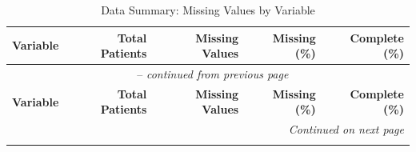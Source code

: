 \begin{longtable}{lrrrr}
\caption{Data Summary: Missing Values by Variable} \label{tab:data_summary} \\
\toprule
\textbf{Variable} & \textbf{Total Patients} & \textbf{Missing Values} & \textbf{Missing (\%)} & \textbf{Complete (\%)} \\
\midrule
\endfirsthead
\multicolumn{5}{c}{\tablename\ \thetable{} -- \textit{continued from previous page}} \\
\toprule
\textbf{Variable} & \textbf{Total Patients} & \textbf{Missing Values} & \textbf{Missing (\%)} & \textbf{Complete (\%)} \\
\midrule
\endhead
\midrule
\multicolumn{5}{r}{\textit{Continued on next page}} \\
\endfoot
\bottomrule
\endlastfoot


\end{longtable}
